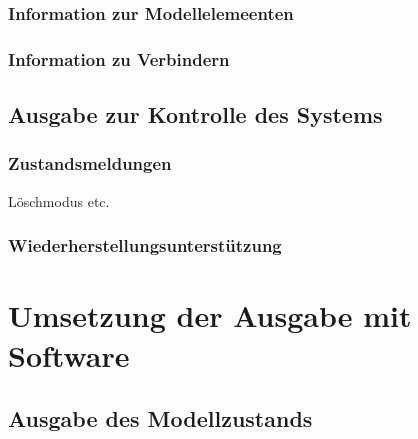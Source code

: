 \subsubsection{Information zur Modellelemeenten} %
\label{ssub:information_zur_modellelemeenten}


\subsubsection{Information zu Verbindern} %
\label{ssub:information_zu_verbindern}


\subsection{Ausgabe zur Kontrolle des Systems} %
\label{sub:ausgabe_zur_kontrolle_des_systems}

\subsubsection{Zustandsmeldungen} %
\label{ssub:zustandsmeldungen}
Löschmodus etc.


\subsubsection{Wiederherstellungsunterstützung} %
\label{ssub:wiederherstellungsunterstützung}



\section{Umsetzung der Ausgabe mit Software} %
\label{sec:umsetzung_der_ausgabe_mit_software}

\subsection{Ausgabe des Modellzustands} %
\label{sub:einsatz_von_jhotdraw}

